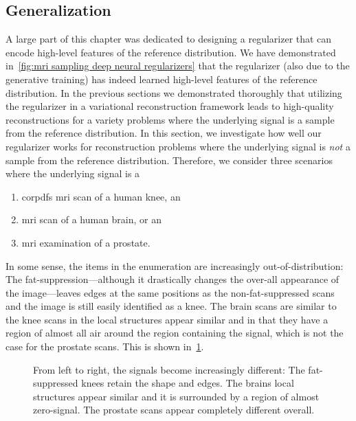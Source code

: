 \subsection{Generalization}%
\label{ssec:generalization}
A large part of this chapter was dedicated to designing a regularizer that can encode high-level features of the reference distribution.
We have demonstrated in~\cref{fig:mri sampling deep neural regularizers} that the regularizer (also due to the generative training) has indeed learned high-level features of the reference distribution.
In the previous sections we demonstrated thoroughly that utilizing the regularizer in a variational reconstruction framework leads to high-quality reconstructions for a variety problems where the underlying signal is a sample from the reference distribution.
In this section, we investigate how well our regularizer works for reconstruction problems where the underlying signal is \emph{not} a sample from the reference distribution.
Therefore, we consider three scenarios where the underlying signal is a
\begin{enumerate}
	\item \gls{corpdfs} \gls{mri} scan of a human knee, an
	\item \gls{mri} scan of a human brain, or an
	\item \gls{mri} examination of a prostate.
\end{enumerate}

In some sense, the items in the enumeration are increasingly out-of-distribution:
The fat-suppression---although it drastically changes the over-all appearance of the image---leaves edges at the same positions as the non-fat-suppressed scans and the image is still easily identified as a knee.
The brain scans are similar to the knee scans in the local structures appear similar and in that they have a region of almost all air around the region containing the signal, which is not the case for the prostate scans.
This is shown in~\cref{fig:ood spectrum}.
\begin{figure}
	\caption[Samples from the distributions considered in the out-of-distribution experiments]{%
		From left to right, the signals become increasingly different:
		The fat-suppressed knees retain the shape and edges.
		The brains local structures appear similar and it is surrounded by a region of almost zero-signal.
		The prostate scans appear completely different overall.
	}%
	\label{fig:ood spectrum}
\end{figure}

